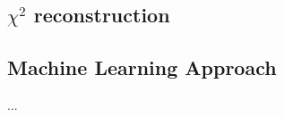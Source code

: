 \subsection{$\chi^{2}$ reconstruction}\label{subsec:chi-square}

\subsection{Machine Learning Approach}\label{subsec:ML approach}


...












